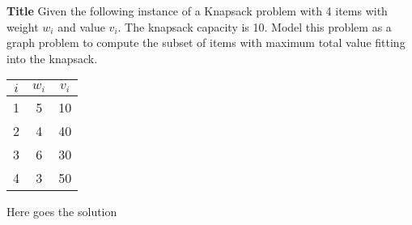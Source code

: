 \question \textbf{Title}
Given the following instance of a Knapsack problem with 4 items with weight $w_i$ and value $v_i$. The knapsack capacity is 10. Model this problem as a graph problem to compute the subset of items with maximum total value fitting into the knapsack.

\begin{tabular}{c | c | c}
    $i$ & $w_i$ & $v_i$ \\
    \hline
    1 & 5 & 10 \\
    2 & 4 & 40 \\
    3 & 6 & 30 \\
    4 & 3 & 50
    \end{tabular}

\begin{solution}
Here goes the solution
\end{solution}